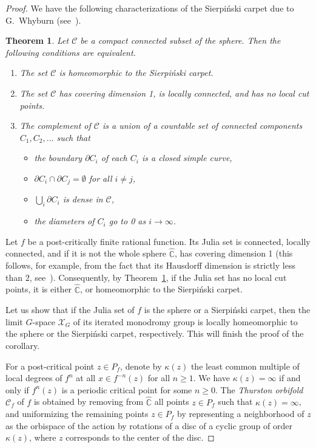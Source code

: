 \documentclass[11pt]{amsart}
\newcommand{\limg}[1][G]{\mathcal{X}_{#1}}
\theoremstyle{definition}
\theoremstyle{plain}
\newtheorem{thm}[defin]{Theorem}
\newtheorem{main thm}{Theorem}
\theoremstyle{remark}
\theoremstyle{plain}
\begin{document}
\begin{proof}
We have the following characterizations of the Sierpi\'nski carpet due to G.~Whyburn (see~\cite{Whyburn1958}).

\begin{thm}
\label{th:Whyburn}
    Let $\mathcal{C}$ be a compact connected subset of the sphere. Then the following conditions are equivalent.
    \begin{enumerate}
        \item The set $\mathcal{C}$ is homeomorphic to the Sierpi\'nski carpet.
        \item The set $\mathcal{C}$ has covering dimension 1, is locally connected, and has no local cut points.
        \item The complement of $\mathcal{C}$ is a union of a countable set of connected components $C_1, C_2, \ldots$ such that  \begin{itemize}
            \item the boundary $\partial C_i$ of each $C_i$ is a closed simple curve,
            \item $\partial C_i\cap\partial C_j=\emptyset$ for all $i\ne j$,
            \item $\bigcup_i\partial C_i$ is dense in $\mathcal{C}$,
            \item the diameters of $C_i$ go to 0 as $i\to\infty$.
        \end{itemize}
    \end{enumerate}
\end{thm}

Let $f$ be a post-critically finite rational function. Its Julia set is connected, locally connected, and if it is not the whole sphere $\widehat{\mathbb{C}}$, has covering dimension 1 (this follows, for example, from the fact that its Hausdorff dimension is strictly less than $2$, see~\cite[Corollary~6.2]{mcmullen}). Consequently, by Theorem~\ref{th:Whyburn}, if the Julia set has no local cut points, it is either $\widehat{\mathbb{C}}$, or homeomorphic to the Sierpi\'nski carpet.

Let us show that if the Julia set of $f$ is the sphere or a Sierpi\'nski carpet, then the limit $G$-space $\limg$ of its iterated monodromy group is locally homeomorphic to the sphere or the Sierpi\'nski carpet, respectively. This will finish the proof of the corollary.

For a post-critical point $z\in P_f$, denote by $\kappa(z)$ the least common multiple of local degrees of $f^n$ at all $x\in f^{-n}(z)$ for all $n\ge 1$. We have $\kappa(z)=\infty$ if and only if $f^n(z)$ is a periodic critical point for some $n\ge 0$.
The \emph{Thurston orbifold} $\mathcal{C}_f$ of $f$ is obtained by removing from $\widehat{\mathbb{C}}$ all points $z\in P_f$ such that $\kappa(z)=\infty$, and uniformizing the remaining points $z\in P_f$ by representing a neighborhood of $z$ as the orbispace of the action by rotations of a disc of a cyclic group of order $\kappa(z)$, where $z$ corresponds to the center of the disc. %


\end{proof}
\end{document}
